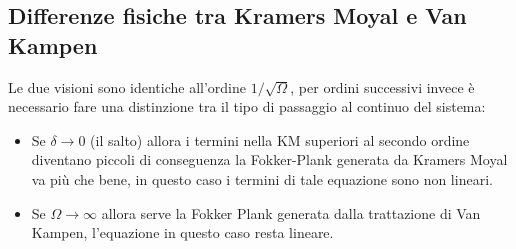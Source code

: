 \subsection{Differenze fisiche tra Kramers Moyal e Van Kampen}%
\label{sub:Differenze fisiche tra Kramers Moyal e Van Kampen}
Le due visioni sono identiche all'ordine $1 /\sqrt{\Omega}$, per ordini successivi invece è necessario fare una distinzione tra il tipo di passaggio al continuo del sistema:
\begin{itemize}
    \item Se $\delta\to 0$ (il salto) allora i termini nella KM superiori al secondo ordine diventano piccoli di conseguenza la Fokker-Plank generata da Kramers Moyal va più che bene, in questo caso i termini di tale equazione sono non lineari.
    \item Se $\Omega\to \infty$ allora serve la Fokker Plank generata dalla trattazione di Van Kampen, l'equazione in questo caso resta lineare.
\end{itemize}
